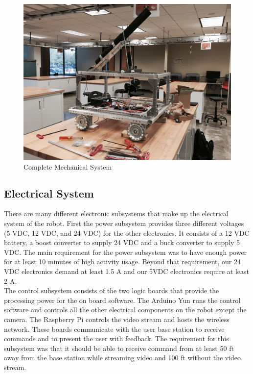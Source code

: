 \documentclass[letterpaper,12pt]{article}
\begin{document}
\begin{figure}[h!]
  \centering
  \includegraphics[width=15cm]{./pics/chassis/robot.jpg}
  \caption{Complete Mechanical System}
  \label{fig:mech_system}
\end{figure}

\subsection{Electrical System}
There are many different electronic subsystems that make up the electrical
system of the robot. First the power subsystem provides three different
voltages (5 VDC,  12 VDC, and 24 VDC) for the other electronics. It consists of
a 12 VDC battery, a boost converter to supply 24 VDC and a buck converter to
supply 5 VDC. The main requirement for the power subsystem was to have enough
power for at least 10 minutes of high activity usage. Beyond that requirement,
our 24 VDC electronics demand at least 1.5 A and our 5VDC electronics require
at least 2 A.\\

The control subsystem consists of the two logic boards that provide the
processing power for the on board software. The Arduino Yun runs the control
software and controls all the other electrical components on the robot except
the camera. The Raspberry Pi controls the video stream and hosts the wireless
network. These boards communicate with the user base station to receive
commands and to present the user with feedback. The requirement for this
subsystem was that it should be able to receive command from at least 50 ft
away from the base station while streaming video and 100 ft without the video
stream.\\
\end{document}
